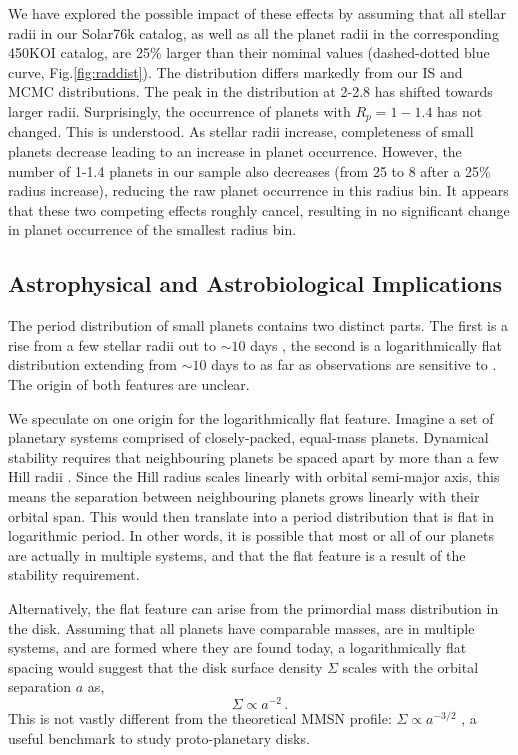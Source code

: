 We have explored the possible impact of these effects by assuming
that all stellar radii in our Solar76k catalog, as well as all
the planet radii in the corresponding 450KOI catalog, are 25\% larger
than their nominal values (dashed-dotted blue curve, Fig.\ref{fig:raddist}). 
The distribution differs markedly from our IS and MCMC distributions. 
The peak in the distribution at 2-2.8\rearth{} has shifted towards
larger radii.  Surprisingly, the occurrence of planets with $R_p =
1-1.4$\rearth{} has not changed.  This is understood. As stellar
radii increase, completeness of small planets decrease leading to an
increase in planet occurrence. However, the number of 1-1.4\rearth{}
planets in our sample also decreases (from 25 to 8 after a 25$\%$
radius increase), reducing the raw planet
occurrence in this radius bin. It appears that these two competing
effects roughly cancel, resulting in no significant change in planet
occurrence of the smallest radius bin. 


\subsection{Astrophysical and Astrobiological Implications}
The period distribution of \kep{} small planets contains two distinct
parts. The first is a rise from a few stellar radii out to $\sim 10$
days \citep[e.g.][]{Youdin,Howard2012}, the second is a
logarithmically flat distribution extending from $\sim 10$ days to as
far as observations are sensitive to \citep[Fig. \ref{fig:period}
here,][]{Petigura2013,Fressin2013}. The origin of both features are
unclear. 

We speculate on one origin for the logarithmically flat feature.
Imagine a set of planetary systems comprised of
closely-packed, equal-mass planets. Dynamical stability requires that
neighbouring planets be spaced apart by more than a few Hill radii
\citep{Chambers1996,Smith2009}. Since the Hill radius scales linearly
with orbital semi-major axis, this means the separation between
neighbouring planets grows linearly with their orbital
span. This would then translate into a period
distribution that is flat in logarithmic period. In other words, it is
possible that most or all of our planets are actually in multiple
systems, and that the flat feature is a result of the stability
requirement.

Alternatively, the flat feature can arise from the primordial mass
distribution in the disk. Assuming that all planets have comparable
masses, are in multiple systems, and are
formed where they are found today, a logarithmically flat
spacing would suggest that the disk surface density $\Sigma$ scales
with the orbital separation $a$ as,
\begin{equation}
\Sigma \propto a^{-2}\, .
\end{equation}
This is not vastly different from the theoretical MMSN profile:
$\Sigma \propto a^{-3/2}$ \citep{Hayashi1981,Weidenschilling1977b}, a
useful benchmark to study proto-planetary disks.

